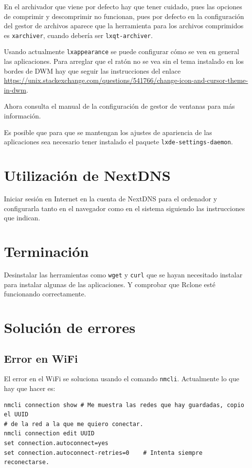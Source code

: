 \documentclass{article}
\begin{document}
    En el archivador que viene por defecto hay que tener cuidado, pues las
    opciones de comprimir y descomprimir no funcionan, pues por defecto en la
    configuración del gestor de archivos aparece que la herramienta para los
    archivos comprimidos es \texttt{xarchiver}, cuando debería ser
    \texttt{lxqt-archiver}.

    Usando actualmente \texttt{lxappearance} se puede configurar cómo se ven
    en general las aplicaciones. Para arreglar que el ratón no se vea sin el
    tema instalado en los bordes de DWM hay que seguir las instrucciones del
    enlace
    \href{https://unix.stackexchange.com/questions/541766/change-icon-and-cursor-theme-in-dwm}
    {https://unix.stackexchange.com/questions/541766/change-icon-and-cursor-theme-in-dwm}.

    Ahora consulta el manual de la configuración de gestor de ventanas para más
    información.

    Es posible que para que se mantengan los ajustes de apariencia de las
    aplicaciones sea necesario tener instalado el paquete
    \texttt{lxde-settings-daemon}.

    \section{Utilización de NextDNS}
    Iniciar sesión en Internet en la cuenta de NextDNS para el ordenador y configurarla
    tanto en el navegador como en el sistema siguiendo las instrucciones que indican.

    \section{Terminación}
    Desinstalar las herramientas como \texttt{wget} y \texttt{curl} que se hayan
    necesitado instalar para instalar algunas de las aplicaciones. Y comprobar
    que Rclone esté funcionando correctamente.

    \section{Solución de errores}

    \subsection{Error en WiFi}
    El error en el WiFi se soluciona usando el comando \texttt{nmcli}. Actualmente
    lo que hay que hacer es:

    \begin{verbatim}
nmcli connection show # Me muestra las redes que hay guardadas, copio el UUID
# de la red a la que me quiero conectar.
nmcli connection edit UUID
set connection.autoconnect=yes
set connection.autoconnect-retries=0    # Intenta siempre reconectarse.
    \end{verbatim}
\end{document}
